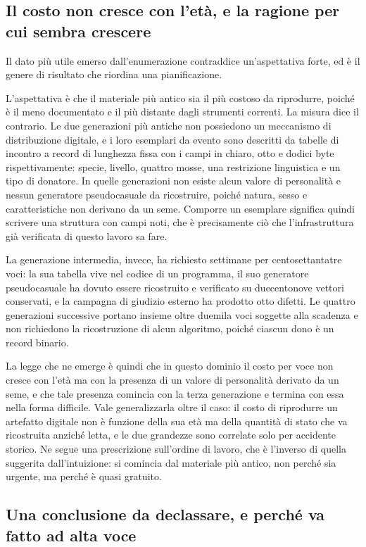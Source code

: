 \subsection*{Il costo non cresce con l'età, e la ragione per cui sembra crescere}

Il dato più utile emerso dall'enumerazione contraddice un'aspettativa forte, ed è il genere di risultato che riordina una pianificazione.

L'aspettativa è che il materiale più antico sia il più costoso da riprodurre, poiché è il meno documentato e il più distante dagli strumenti correnti. La misura dice il contrario. Le due generazioni più antiche non possiedono un meccanismo di distribuzione digitale, e i loro esemplari da evento sono descritti da tabelle di incontro a record di lunghezza fissa con i campi in chiaro, otto e dodici byte rispettivamente: specie, livello, quattro mosse, una restrizione linguistica e un tipo di donatore. In quelle generazioni non esiste alcun valore di personalità e nessun generatore pseudocasuale da ricostruire, poiché natura, sesso e caratteristiche non derivano da un seme. Comporre un esemplare significa quindi scrivere una struttura con campi noti, che è precisamente ciò che l'infrastruttura già verificata di questo lavoro sa fare.

La generazione intermedia, invece, ha richiesto settimane per centosettantatre voci: la sua tabella vive nel codice di un programma, il suo generatore pseudocasuale ha dovuto essere ricostruito e verificato su duecentonove vettori conservati, e la campagna di giudizio esterno ha prodotto otto difetti. Le quattro generazioni successive portano insieme oltre duemila voci soggette alla scadenza e non richiedono la ricostruzione di alcun algoritmo, poiché ciascun dono è un record binario.

La legge che ne emerge è quindi che in questo dominio il costo per voce non cresce con l'età ma con la presenza di un valore di personalità derivato da un seme, e che tale presenza comincia con la terza generazione e termina con essa nella forma difficile. Vale generalizzarla oltre il caso: il costo di riprodurre un artefatto digitale non è funzione della sua età ma della quantità di stato che va ricostruita anziché letta, e le due grandezze sono correlate solo per accidente storico. Ne segue una prescrizione sull'ordine di lavoro, che è l'inverso di quella suggerita dall'intuizione: si comincia dal materiale più antico, non perché sia urgente, ma perché è quasi gratuito.

\subsection*{Una conclusione da declassare, e perché va fatto ad alta voce}

